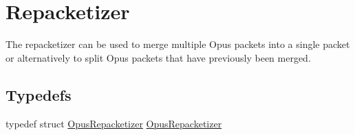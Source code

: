 \hypertarget{group__opus__repacketizer}{
\section{Repacketizer}
\label{group__opus__repacketizer}
}


The repacketizer can be used to merge multiple Opus packets into a single packet or alternatively to split Opus packets that have previously been merged.  
\subsection*{Typedefs}
\begin{DoxyCompactItemize}
\item 
typedef struct \hyperlink{group__opus__repacketizer_ga1f85070a64bcbf5bf24f5ccb80323e7b}{OpusRepacketizer} \hyperlink{group__opus__repacketizer_ga1f85070a64bcbf5bf24f5ccb80323e7b}{OpusRepacketizer}
\end{DoxyCompactItemize}
